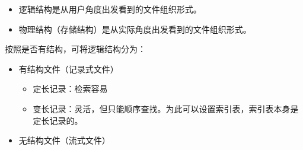 \documentclass[12pt, a4paper, oneside]{ctexart}
\begin{document}
\begin{itemize}
  \item 逻辑结构是从用户角度出发看到的文件组织形式。
  \item 物理结构（存储结构）是从实际角度出发看到的文件组织形式。
\end{itemize}

按照是否有结构，可将逻辑结构分为：
\begin{itemize}
  \item 有结构文件（记录式文件）
  \begin{itemize}
    \item 定长记录：检索容易
    \item 变长记录：灵活，但只能顺序查找。为此可以设置索引表，索引表本身是定长记录的。
  \end{itemize}
  \item 无结构文件（流式文件）
\end{itemize}
\end{document}
